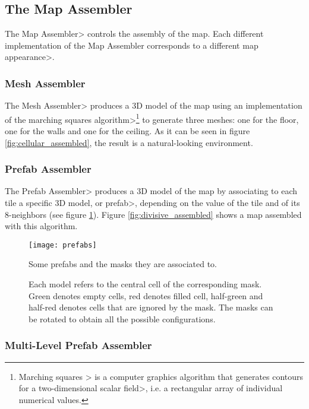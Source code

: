 
\subsection{The Map Assembler}

The \<Map Assembler> controls the assembly of the map. Each different implementation of the Map Assembler corresponds to a different \<map appearance>.


\subsubsection{Mesh Assembler}

The \<Mesh Assembler> produces a 3D model of the map using an implementation of the \<marching squares algorithm>\footnote{\<Marching squares > is a computer graphics algorithm that generates contours for a \<two-dimensional scalar field>, i.e. a rectangular array of individual numerical values.} to generate three meshes: one for the floor, one for the walls and one for the ceiling. As it can be seen in figure \ref{fig:cellular_assembled}, the result is a natural-looking environment.


\subsubsection{Prefab Assembler}

The \<Prefab Assembler> produces a 3D model of the map by associating to each tile a specific 3D model, or \<prefab>, depending on the value of the tile and of its 8-neighbors (see figure \ref{fig:prefabs}). Figure \ref{fig:divisive_assembled} shows a map assembled with this algorithm.

\begin{figure}
\centering
\texttt{[image: prefabs]}
\caption{Some prefabs and the masks they are associated to.}
\caption*{Each model refers to the central cell of the corresponding mask. Green denotes empty cells, red denotes filled cell, half-green and half-red denotes cells that are ignored by the mask. The masks can be rotated to obtain all the possible configurations.}
\label{fig:prefabs}
\end{figure}


\subsubsection{Multi-Level Prefab Assembler}

